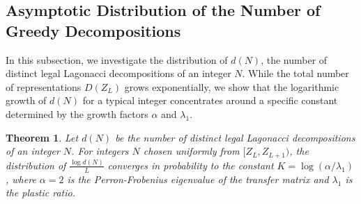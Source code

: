 \documentclass[11pt]{amsart}
\theoremstyle{plain}
\numberwithin{equation}{section} %
\newtheorem{theorem}[thm]{Theorem}
\numberwithin{table}{section} %
\numberwithin{figure}{section}
\begin{document}
	
	
	
	\subsection{Asymptotic Distribution of the Number of Greedy Decompositions}
	
	In this subsection, we investigate the distribution of $d(N)$, the number of distinct legal Lagonacci decompositions of an integer $N$. While the total number of representations $D(Z_{L})$ grows exponentially, we show that the logarithmic growth of $d(N)$ for a typical integer concentrates around a specific constant determined by the growth factors $\alpha$ and $\lambda_1$.
	
	\begin{theorem}
		Let $d(N)$ be the number of distinct legal Lagonacci decompositions of an integer $N$. For integers $N$ chosen uniformly from $[Z_{L}, Z_{L+1})$, the distribution of $\frac{\log d(N)}{L}$ converges in probability to the constant $K = \log(\alpha/\lambda_1)$, where $\alpha=2$ is the Perron-Frobenius eigenvalue of the transfer matrix and $\lambda_1$ is the plastic ratio.
	\end{theorem}
	
\end{document}
